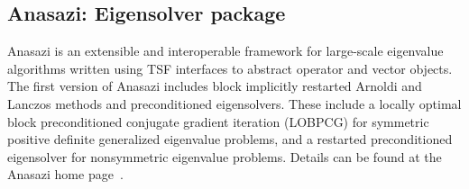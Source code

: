 \documentclass[12pt,relax]{TPA}
\begin{document}

\subsection{Anasazi: Eigensolver package}

Anasazi is an extensible and interoperable framework for 
large-scale eigenvalue algorithms written using TSF interfaces to
abstract operator and vector objects.  
%
%
The first version of  
Anasazi includes block implicitly restarted Arnoldi and Lanczos methods 
and preconditioned eigensolvers.
These include a locally optimal block preconditioned conjugate 
gradient iteration  (LOBPCG) for symmetric positive definite 
generalized eigenvalue problems, and a 
restarted preconditioned eigensolver for nonsymmetric eigenvalue
problems.  Details can be found at the Anasazi home page~\cite{Anasazi-home-page}.
\end{document}
